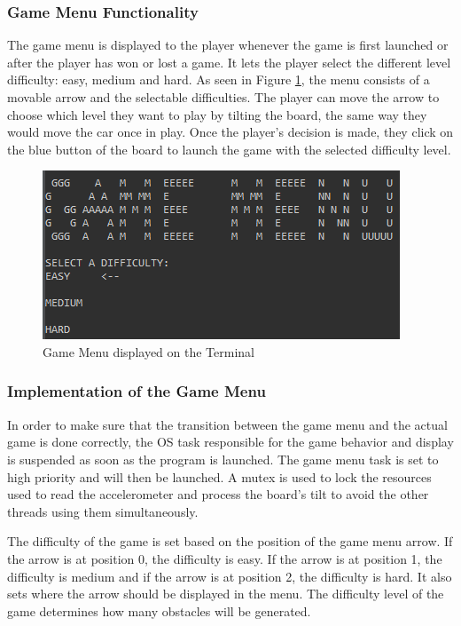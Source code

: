 \documentclass[conference]{IEEEtran}
\begin{document}
\subsubsection{Game Menu Functionality}
The game menu is displayed to the player whenever the game is first launched or after the player has won or lost a game. It lets the player select the different level difficulty: easy, medium and hard. As seen in Figure \ref{fig:game_menu}, the menu consists of a movable arrow and the selectable difficulties. The player can move the arrow to choose which level they want to play by tilting the board, the same way they would move the car once in play. Once the player's decision is made, they click on the blue button of the board to launch the game with the selected difficulty level. 
\begin{figure}
    \centering
    \includegraphics[width=1\linewidth]{game_menu.png}
    \caption{Game Menu displayed on the Terminal}
    \label{fig:game_menu}
\end{figure}

\subsubsection{Implementation of the Game Menu}
In order to make sure that the transition between the game menu and the actual game is done correctly, the OS task responsible for the game behavior and display is suspended as soon as the program is launched. The game menu task is set to high priority and will then be launched. A mutex is used to lock the resources used to read the accelerometer and process the board's tilt to avoid the other threads using them simultaneously. 

The difficulty of the game is set based on the position of the game menu arrow. If the arrow is at position 0, the difficulty is easy. If the arrow is at position 1, the difficulty is medium and if the arrow is at position 2, the difficulty is hard. It also sets where the arrow should be displayed in the menu. The difficulty level of the game determines how many obstacles will be generated.
\end{document}
